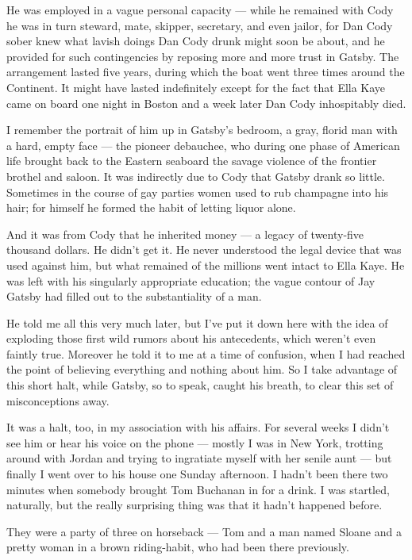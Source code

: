 \documentclass{znotebook}
\begin{document}
He was employed in a vague personal capacity — while he remained with Cody he was in turn steward, mate, skipper, secretary, and even jailor, for Dan Cody sober knew what lavish doings Dan Cody drunk might soon be about, and he provided for such contingencies by reposing more and more trust in Gatsby. The arrangement lasted five years, during which the boat went three times around the Continent. It might have lasted indefinitely except for the fact that Ella Kaye came on board one night in Boston and a week later Dan Cody inhospitably died.

I remember the portrait of him up in Gatsby's bedroom, a gray, florid man with a hard, empty face — the pioneer debauchee, who during one phase of American life brought back to the Eastern seaboard the savage violence of the frontier brothel and saloon. It was indirectly due to Cody that Gatsby drank so little. Sometimes in the course of gay parties women used to rub champagne into his hair; for himself he formed the habit of letting liquor alone.

And it was from Cody that he inherited money — a legacy of twenty-five thousand dollars. He didn't get it. He never understood the legal device that was used against him, but what remained of the millions went intact to Ella Kaye. He was left with his singularly appropriate education; the vague contour of Jay Gatsby had filled out to the substantiality of a man.

He told me all this very much later, but I've put it down here with the idea of exploding those first wild rumors about his antecedents, which weren't even faintly true. Moreover he told it to me at a time of confusion, when I had reached the point of believing everything and nothing about him. So I take advantage of this short halt, while Gatsby, so to speak, caught his breath, to clear this set of misconceptions away.

It was a halt, too, in my association with his affairs. For several weeks I didn't see him or hear his voice on the phone — mostly I was in New York, trotting around with Jordan and trying to ingratiate myself with her senile aunt — but finally I went over to his house one Sunday afternoon. I hadn't been there two minutes when somebody brought Tom Buchanan in for a drink. I was startled, naturally, but the really surprising thing was that it hadn't happened before.

They were a party of three on horseback — Tom and a man named Sloane and a pretty woman in a brown riding-habit, who had been there previously.
\end{document}
